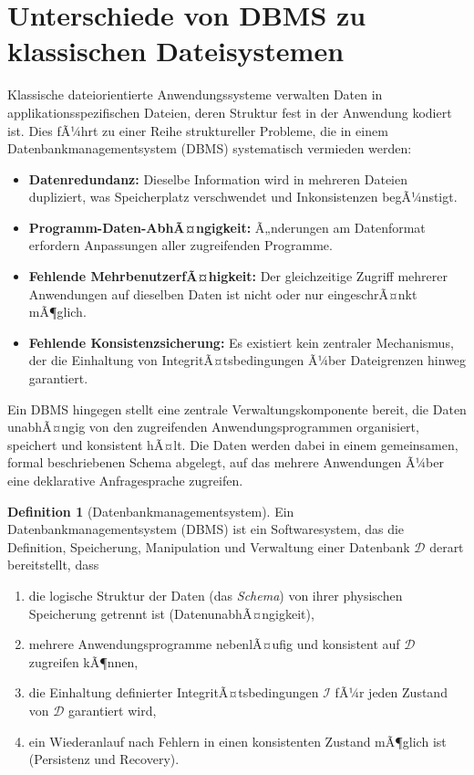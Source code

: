 ﻿\documentclass[a4paper,12pt]{report}
\theoremstyle{definition}
\newtheorem{definition}{Definition}[chapter]
\theoremstyle{remark}
\begin{document}
\section{Unterschiede von DBMS zu klassischen Dateisystemen}

Klassische dateiorientierte Anwendungssysteme verwalten Daten in
applikationsspezifischen Dateien, deren Struktur fest in der Anwendung
kodiert ist. Dies fÃ¼hrt zu einer Reihe struktureller Probleme, die in
einem Datenbankmanagementsystem (DBMS) systematisch vermieden werden:

\begin{itemize}
  \item \textbf{Datenredundanz:} Dieselbe Information wird in mehreren
    Dateien dupliziert, was Speicherplatz verschwendet und
    Inkonsistenzen begÃ¼nstigt.
  \item \textbf{Programm-Daten-AbhÃ¤ngigkeit:} Ã„nderungen am
    Datenformat erfordern Anpassungen aller zugreifenden Programme.
  \item \textbf{Fehlende MehrbenutzerfÃ¤higkeit:} Der gleichzeitige
    Zugriff mehrerer Anwendungen auf dieselben Daten ist nicht oder nur
    eingeschrÃ¤nkt mÃ¶glich.
  \item \textbf{Fehlende Konsistenzsicherung:} Es existiert kein
    zentraler Mechanismus, der die Einhaltung von
    IntegritÃ¤tsbedingungen Ã¼ber Dateigrenzen hinweg garantiert.
\end{itemize}

Ein DBMS hingegen stellt eine zentrale Verwaltungskomponente bereit, die
Daten unabhÃ¤ngig von den zugreifenden Anwendungsprogrammen organisiert,
speichert und konsistent hÃ¤lt. Die Daten werden dabei in einem
gemeinsamen, formal beschriebenen Schema abgelegt, auf das mehrere
Anwendungen Ã¼ber eine deklarative Anfragesprache zugreifen.

\begin{definition}[Datenbankmanagementsystem]
\label{def:dbms}
Ein Datenbankmanagementsystem (DBMS) ist ein Softwaresystem, das die
Definition, Speicherung, Manipulation und Verwaltung einer Datenbank
$\mathcal{D}$ derart bereitstellt, dass
\begin{enumerate}
  \item die logische Struktur der Daten (das \emph{Schema}) von ihrer
    physischen Speicherung getrennt ist (DatenunabhÃ¤ngigkeit),
  \item mehrere Anwendungsprogramme nebenlÃ¤ufig und konsistent auf
    $\mathcal{D}$ zugreifen kÃ¶nnen,
  \item die Einhaltung definierter IntegritÃ¤tsbedingungen
    $\mathcal{I}$ fÃ¼r jeden Zustand von $\mathcal{D}$ garantiert wird,
  \item ein Wiederanlauf nach Fehlern in einen konsistenten Zustand
    mÃ¶glich ist (Persistenz und Recovery).
\end{enumerate}
\end{definition}
\end{document}
